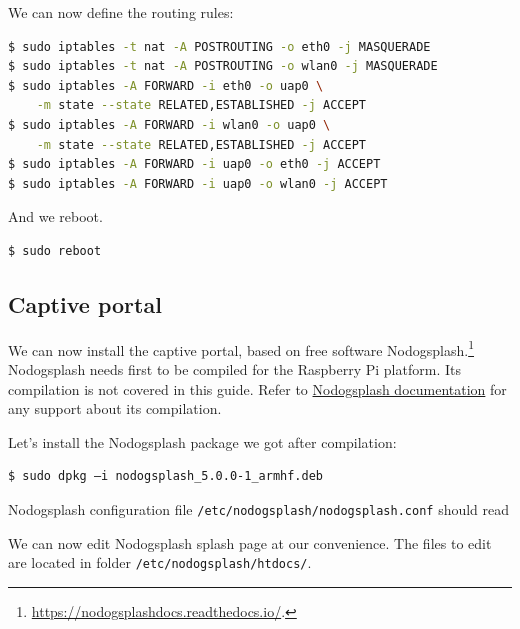 \documentclass[12pt]{article}
\begin{document}
We can now define the routing rules:
\begin{lstlisting}[language=bash]
$ sudo iptables -t nat -A POSTROUTING -o eth0 -j MASQUERADE
$ sudo iptables -t nat -A POSTROUTING -o wlan0 -j MASQUERADE
$ sudo iptables -A FORWARD -i eth0 -o uap0 \
    -m state --state RELATED,ESTABLISHED -j ACCEPT
$ sudo iptables -A FORWARD -i wlan0 -o uap0 \
    -m state --state RELATED,ESTABLISHED -j ACCEPT
$ sudo iptables -A FORWARD -i uap0 -o eth0 -j ACCEPT
$ sudo iptables -A FORWARD -i uap0 -o wlan0 -j ACCEPT
\end{lstlisting}

And we reboot.
\begin{lstlisting}[language=bash]
$ sudo reboot
\end{lstlisting}

\subsection{Captive portal}

We can now install the captive portal, based on free software Nodogsplash.\footnote{\url{https://nodogsplashdocs.readthedocs.io/}.}
Nodogsplash needs first to be compiled for the Raspberry Pi platform.
Its compilation is not covered in this guide.
Refer to \href{https://nodogsplashdocs.readthedocs.io/en/stable/compile.html}{Nodogsplash documentation} for any support about its compilation.

Let's install the Nodogsplash package we got after compilation:
\begin{lstlisting}[language=bash]
$ sudo dpkg –i nodogsplash_5.0.0-1_armhf.deb
\end{lstlisting}
Nodogsplash configuration file \lstinline{/etc/nodogsplash/nodogsplash.conf} should read


We can now edit Nodogsplash splash page at our convenience.
The files to edit are located in folder \lstinline{/etc/nodogsplash/htdocs/}.
\end{document}
